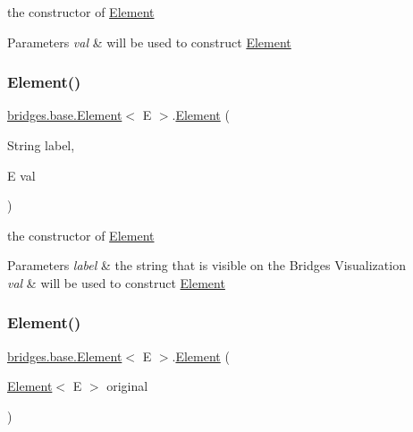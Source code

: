 the constructor of \hyperlink{classbridges_1_1base_1_1_element}{Element} 
\begin{DoxyParams}{Parameters}
{\em val} & will be used to construct \hyperlink{classbridges_1_1base_1_1_element}{Element} \\
\hline
\end{DoxyParams}
\hypertarget{classbridges_1_1base_1_1_element_a14e857e8050eac518900a458f0364d8e}{}\label{classbridges_1_1base_1_1_element_a14e857e8050eac518900a458f0364d8e} 
\subsubsection{\texorpdfstring{Element()}{Element()}\hspace{0.1cm}{\footnotesize\ttfamily [3/4]}}
{\footnotesize\ttfamily \hyperlink{classbridges_1_1base_1_1_element}{bridges.\+base.\+Element}$<$ E $>$.\hyperlink{classbridges_1_1base_1_1_element}{Element} (\begin{DoxyParamCaption}\item[{String}]{label,  }\item[{E}]{val }\end{DoxyParamCaption})}

the constructor of \hyperlink{classbridges_1_1base_1_1_element}{Element} 
\begin{DoxyParams}{Parameters}
{\em label} & the string that is visible on the Bridges Visualization \\
\hline
{\em val} & will be used to construct \hyperlink{classbridges_1_1base_1_1_element}{Element} \\
\hline
\end{DoxyParams}
\hypertarget{classbridges_1_1base_1_1_element_a91db9de70b65a1d7b5f27c1c0b909832}{}\label{classbridges_1_1base_1_1_element_a91db9de70b65a1d7b5f27c1c0b909832} 
\subsubsection{\texorpdfstring{Element()}{Element()}\hspace{0.1cm}{\footnotesize\ttfamily [4/4]}}
{\footnotesize\ttfamily \hyperlink{classbridges_1_1base_1_1_element}{bridges.\+base.\+Element}$<$ E $>$.\hyperlink{classbridges_1_1base_1_1_element}{Element} (\begin{DoxyParamCaption}\item[{\hyperlink{classbridges_1_1base_1_1_element}{Element}$<$ E $>$}]{original }\end{DoxyParamCaption})}

